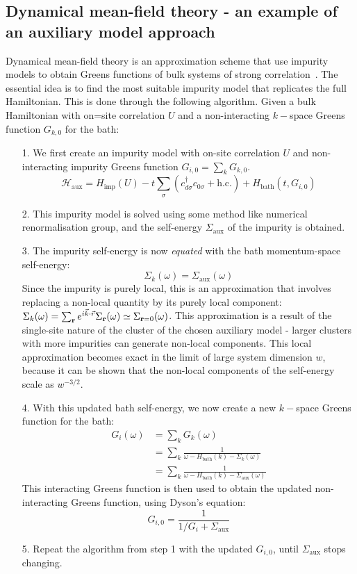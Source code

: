 \documentclass[reprint,hidelinks]{revtex4-2}
\begin{document}
\subsection*{Dynamical mean-field theory - an example of an auxiliary model approach}
Dynamical mean-field theory is an approximation scheme that use impurity models to obtain Greens functions of bulk systems of strong correlation~\cite{kotliar1996,kotliar1992}. The essential idea is to find the most suitable impurity model that replicates the full Hamiltonian. This is done through the following algorithm. Given a bulk Hamiltonian with on=site correlation \(U\) and a non-interacting \(k-\)space Greens function \(G_{k,0}\) for the bath:
\begin{itemize}
	\item[1.] We first create an impurity model with on-site correlation \(U\) and non-interacting impurity Greens function \(G_{i,0} = \sum_k G_{k,0}\).
		\[\mathcal{H}_\text{aux} = H_\text{imp}(U) -t \sum_\sigma \left(c^\dagger_{d\sigma}c_{0\sigma} + \text{h.c.}\right) + H_\text{bath}\left(t,G_{i,0}\right)\]

	\item[2.] This impurity model is solved using some method like numerical renormalisation group, and the self-energy \(\Sigma_\text{aux}\) of the impurity is obtained.

	\item[3.] The impurity self-energy is now {\it equated} with the bath momentum-space self-energy:
		\[\Sigma_{k}(\omega) = \Sigma_\text{aux}(\omega)\]
		Since the impurity is purely local, this is an approximation that involves replacing a non-local quantity by its purely local component: \(\Sigma_{k}(\omega) = \sum_{{\bf r}}e^{i \vec{k}\cdot\vec{r}}\Sigma_{{\bf r}}(\omega) \simeq \Sigma_{{\bf r} = 0}(\omega)\). This approximation is a result of the single-site nature of the cluster of the chosen auxiliary model - larger clusters with more impurities can generate non-local components. This local approximation becomes exact in the limit of large system dimension \(w\), because it can be shown that the non-local components of the self-energy scale as \(w^{-3/2}\).

	\item[4.] With this updated bath self-energy, we now create a new \(k-\)space Greens function for the bath:
		\begin{equation}\begin{aligned}
		G_{i}(\omega) &= \sum_k G_{k}(\omega) \\
			      &= \sum_k \frac{1}{\omega - H_\text{bath}(k) - \Sigma_k(\omega)} \\
			      &= \sum_k \frac{1}{\omega - H_\text{bath}(k) - \Sigma_\text{aux}(\omega)}
		\end{aligned}\end{equation}
	This interacting Greens function is then used to obtain the updated non-interacting Greens function, using Dyson's equation:
	\[G_{i,0} = \frac{1}{1/G_{i} + \Sigma_\text{aux}}\]
	\item[5.] Repeat the algorithm from step 1 with the updated \(G_{i,0}\), until \(\Sigma_\text{aux}\) stops changing.
\end{itemize}
\end{document}

